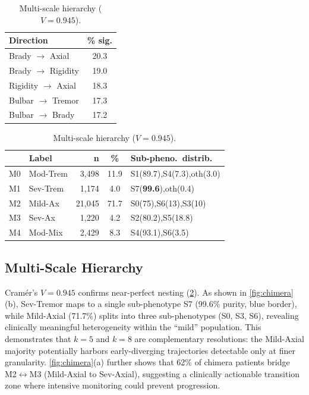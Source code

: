\documentclass[runningheads]{llncs}
\begin{document}
\begin{table}[t]
\begin{minipage}[t]{0.40\textwidth}
\centering
\caption{Top 5 Granger-predictive directions ($n{=}1{,}677$).}\label{tab:granger}
{\footnotesize
\begin{tabular}{lc}
\toprule
\textbf{Direction} & \textbf{\% sig.} \\
\midrule
Brady $\rightarrow$ Axial & 20.3 \\
Brady $\rightarrow$ Rigidity & 19.0 \\
Rigidity $\rightarrow$ Axial & 18.3 \\
Bulbar $\rightarrow$ Tremor & 17.3 \\
Bulbar $\rightarrow$ Brady & 17.2 \\
\bottomrule
\end{tabular}
}
\end{minipage}\hfill
\begin{minipage}[t]{0.57\textwidth}
\centering
\caption{Multi-scale hierarchy ($V{=}0.945$).}\label{tab:hierarchy}
{\footnotesize
\begin{tabular}{llrcl}
\toprule
 & \textbf{Label} & \textbf{n} & \textbf{\%} & \textbf{Sub-pheno.\ distrib.} \\
\midrule
M0 & Mod-Trem & 3{,}498 & 11.9 & S1(89.7),S4(7.3),oth(3.0) \\
M1 & Sev-Trem & 1{,}174 & 4.0 & S7(\textbf{99.6}),oth(0.4) \\
M2 & Mild-Ax & 21{,}045 & 71.7 & S0(75),S6(13),S3(10) \\
M3 & Sev-Ax & 1{,}220 & 4.2 & S2(80.2),S5(18.8) \\
M4 & Mod-Mix & 2{,}429 & 8.3 & S4(93.1),S6(3.5) \\
\bottomrule
\end{tabular}
}
\end{minipage}
\end{table}

\subsection{Multi-Scale Hierarchy}

Cram\'{e}r's $V{=}0.945$ confirms near-perfect nesting (\cref{tab:hierarchy}). As shown in \cref{fig:chimera}(b), Sev-Tremor maps to a single sub-phenotype S7 (99.6\% purity, blue border), while Mild-Axial (71.7\%) splits into three sub-phenotypes (S0, S3, S6), revealing clinically meaningful heterogeneity within the ``mild'' population. This demonstrates that $k{=}5$ and $k{=}8$ are complementary resolutions: the Mild-Axial majority potentially harbors early-diverging trajectories detectable only at finer granularity. \cref{fig:chimera}(a) further shows that 62\% of chimera patients bridge M2$\leftrightarrow$M3 (Mild-Axial to Sev-Axial), suggesting a clinically actionable transition zone where intensive monitoring could prevent progression.
\end{document}
